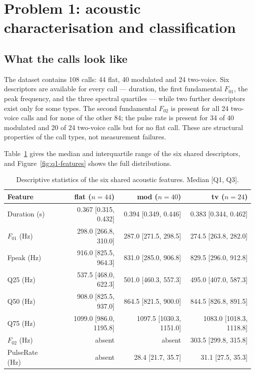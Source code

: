 \section{Problem 1: acoustic characterisation and classification}\label{sec:q1}

\subsection{What the calls look like}

The dataset contains 108 calls: 44 flat, 40 modulated and 24 two-voice. Six descriptors are
available for every call --- duration, the first fundamental $F_{01}$, the peak frequency, and
the three spectral quartiles --- while two further descriptors exist only for some types. The
second fundamental $F_{02}$ is present for all 24 two-voice calls and for none of the other 84;
the pulse rate is present for 34 of 40 modulated and 20 of 24 two-voice calls but for no flat
call. These are structural properties of the call types, not measurement failures.

Table~\ref{tab:q1-desc} gives the median and interquartile range of the six shared descriptors,
and Figure~\ref{fig:q1-features} shows the full distributions.

\begin{table}[htbp]
  \centering
  \caption{Descriptive statistics of the six shared acoustic features. Median [Q1, Q3].}\label{tab:q1-desc}
  \small
  \begin{tabular}{lrrr}
    \toprule
    Feature & flat ($n=44$) & mod ($n=40$) & tv ($n=24$) \\
    \midrule
    Duration (s) & 0.367 [0.315, 0.432] & 0.394 [0.349, 0.446] & 0.383 [0.344, 0.462] \\
    $F_{01}$ (Hz) & 298.0 [266.8, 310.0] & 287.0 [271.5, 298.5] & 274.5 [263.8, 282.0] \\
    Fpeak (Hz) & 916.0 [825.5, 964.3] & 831.0 [285.0, 906.8] & 829.5 [296.0, 912.8] \\
    Q25 (Hz) & 537.5 [468.0, 622.3] & 501.0 [460.3, 557.3] & 495.0 [407.0, 587.3] \\
    Q50 (Hz) & 908.0 [825.5, 937.0] & 864.5 [821.5, 900.0] & 844.5 [826.8, 891.5] \\
    Q75 (Hz) & 1099.0 [986.0, 1195.8] & 1097.5 [1030.3, 1151.0] & 1083.0 [1018.3, 1118.8] \\
    \midrule
    $F_{02}$ (Hz) & absent & absent & 303.5 [299.8, 315.8] \\
    PulseRate (Hz) & absent & 28.4 [21.7, 35.7] & 31.1 [27.5, 35.3] \\
    \bottomrule
  \end{tabular}
\end{table}

